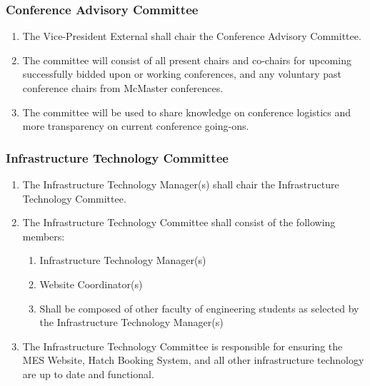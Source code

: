 \subsubsection{Conference Advisory Committee}
\label{conference-advisory-committee}
\begin{enumerate}
 \item
  The Vice-President External shall chair the Conference Advisory Committee.
 \item
  The committee will consist of all present chairs and co-chairs for upcoming successfully bidded upon or working conferences, and any voluntary past conference chairs from McMaster conferences.
 \item
  The committee will be used to share knowledge on conference logistics and more transparency on current conference going-ons.
\end{enumerate}

\subsubsection{Infrastructure Technology Committee} 
\label{infrastructure-technology-committee} 
\begin{enumerate} 
  \item    
   The Infrastructure Technology Manager(s) shall chair the Infrastructure Technology Committee. 
  \item    
   The Infrastructure Technology Committee shall consist of the following members: 
   
   \begin{enumerate} 
    \item    
     Infrastructure Technology Manager(s) 
    \item    
     Website Coordinator(s)   
    \item    
     Shall be composed of other faculty of engineering students as selected by the Infrastructure Technology Manager(s) 
   \end{enumerate}    
  \item    
   The Infrastructure Technology Committee is responsible for ensuring the MES Website, Hatch Booking System, and all other infrastructure technology are up to date and functional. 
  \end{enumerate}
